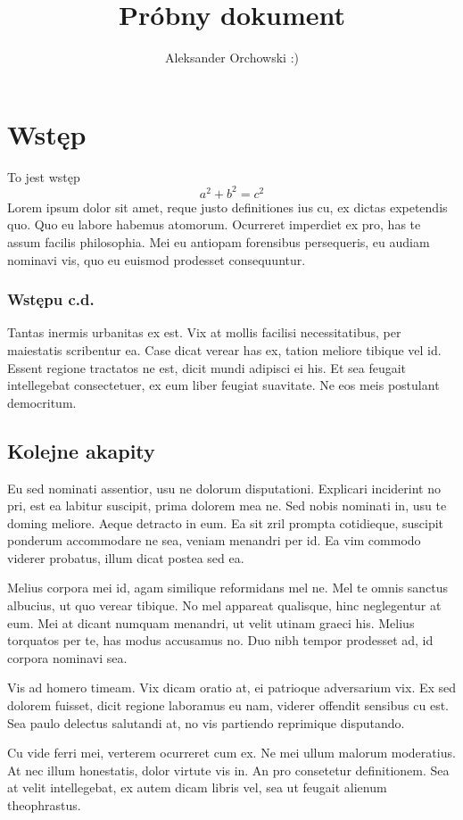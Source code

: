 \documentclass{book}
\title{Próbny dokument}
\author{Aleksander Orchowski :)}
\date{}
\begin{document}
	\maketitle
	\newpage
	\chapter{Wstęp}

	To jest wstęp
	$$a^2 + b^2 = c^2$$
	Lorem ipsum dolor sit amet, reque justo definitiones ius cu, ex dictas expetendis quo. Quo eu labore habemus atomorum. Ocurreret imperdiet ex pro, has te assum facilis philosophia. Mei eu antiopam forensibus persequeris, eu audiam nominavi vis, quo eu euismod prodesset consequuntur.
		\subsection{Wstępu c.d.}
	Tantas inermis urbanitas ex est. Vix at mollis facilisi necessitatibus, per maiestatis scribentur ea. Case dicat verear has ex, tation meliore tibique vel id. Essent regione tractatos ne est, dicit mundi adipisci ei his. Et sea feugait intellegebat consectetuer, ex eum liber feugiat suavitate. Ne eos meis postulant democritum.
		\section{Kolejne akapity}
	Eu sed nominati assentior, usu ne dolorum disputationi. Explicari inciderint no pri, est ea labitur suscipit, prima dolorem mea ne. Sed nobis nominati in, usu te doming meliore. Aeque detracto in eum. Ea sit zril prompta cotidieque, suscipit ponderum accommodare ne sea, veniam menandri per id. Ea vim commodo viderer probatus, illum dicat postea sed ea.
	
	Melius corpora mei id, agam similique reformidans mel ne. Mel te omnis sanctus albucius, ut quo verear tibique. No mel appareat qualisque, hinc neglegentur at eum. Mei at dicant numquam menandri, ut velit utinam graeci his. Melius torquatos per te, has modus accusamus no. Duo nibh tempor prodesset ad, id corpora nominavi sea.
	
	Vis ad homero timeam. Vix dicam oratio at, ei patrioque adversarium vix. Ex sed dolorem fuisset, dicit regione laboramus eu nam, viderer offendit sensibus cu est. Sea paulo delectus salutandi at, no vis partiendo reprimique disputando.
	
	Cu vide ferri mei, verterem ocurreret cum ex. Ne mei ullum malorum moderatius. At nec illum honestatis, dolor virtute vis in. An pro consetetur definitionem. Sea at velit intellegebat, ex autem dicam libris vel, sea ut feugait alienum theophrastus.
\end{document}
